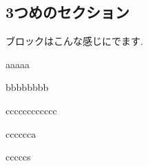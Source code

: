 \documentclass[10pt,dvipdfmx]{beamer}
\begin{document}
\begin{frame}
  \section{3つめのセクション}
  ブロックはこんな感じにでます.
  \begin{block}
    aaaaa
  \end{block}
  \begin{alertblock}
    bbbbbbbb
  \end{alertblock}
  \begin{exampleblock}
    cccccccccccc
  \end{exampleblock}
  \begin{exampleblock}
    cccccca
  \end{exampleblock}
  \begin{exampleblock}
    cccccs
  \end{exampleblock}
\end{frame}
\frame{}
\frame{}
\frame{}
\frame{}
\end{document}
